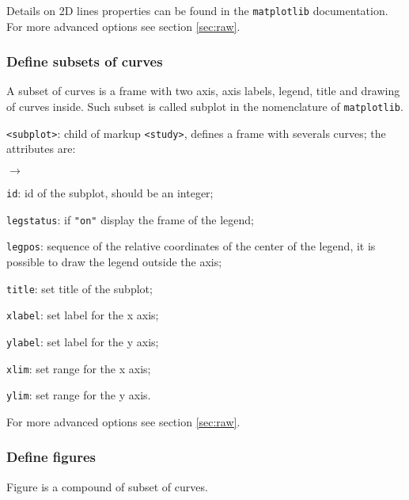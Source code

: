 \documentclass[a4paper,10pt,twoside]{csshortdoc}
\begin{document}
Details on 2D lines properties can be found in the \texttt{matplotlib}
documentation. For more advanced options see section \ref{sec:raw}.

\subsubsection{Define subsets of curves}

A subset of curves is a frame with two axis, axis labels, legend, title and
drawing of curves inside. Such subset is called subplot in the nomenclature
of \texttt{matplotlib}.

\texttt{<subplot>}: child of markup \texttt{<study>}, defines a frame with
severals curves; the attributes are:
\begin{list}{$\rightarrow$}{}
\item \texttt{id}: id of the subplot, should be an integer;
\item \texttt{legstatus}: if \texttt{"on"} display the frame of the legend;
\item \texttt{legpos}: sequence of the relative coordinates of the center of
the legend, it is possible to draw the legend outside the axis;
\item \texttt{title}: set title of the subplot;
\item \texttt{xlabel}: set label for the x axis;
\item \texttt{ylabel}: set label for the y axis;
\item \texttt{xlim}: set range for the x axis;
\item \texttt{ylim}: set range for the y axis.
\end{list}

For more advanced options see section \ref{sec:raw}.

\subsubsection{Define figures}

Figure is a compound of subset of curves.
\end{document}
